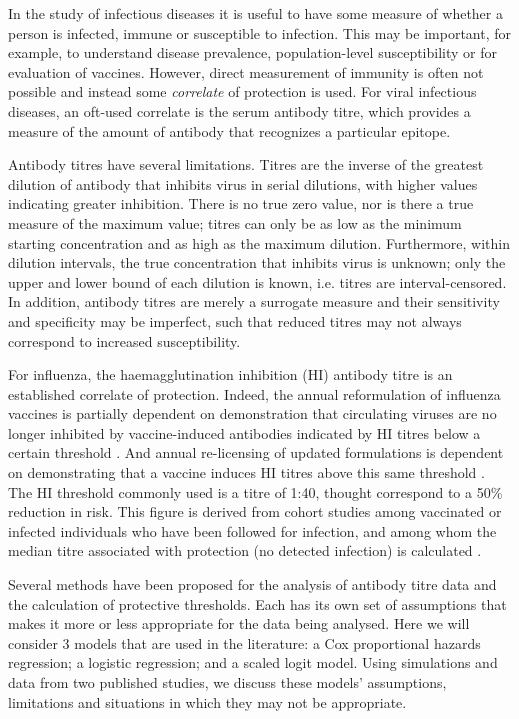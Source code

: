 In the study of infectious diseases it is useful to have some measure of whether a person is infected, immune or susceptible to infection. This may be important, for example, to understand disease prevalence, population-level susceptibility or for evaluation of vaccines.  However, direct measurement of immunity is often not possible and instead some \textit{correlate} of protection is used. For viral infectious diseases, an oft-used correlate is the serum antibody titre, which provides a measure of the amount of antibody that recognizes a particular epitope. 

Antibody titres have several limitations. Titres are the inverse of the greatest dilution of antibody that inhibits virus in serial dilutions, with higher values indicating greater inhibition. There is no true zero value, nor is there a true measure of the maximum value; titres can only be as low as the minimum starting concentration and as high as the maximum dilution.  Furthermore, within dilution intervals, the true concentration that inhibits virus is unknown; only the upper and lower bound of each dilution is known, i.e. titres are interval-censored. In addition, antibody titres are merely a surrogate measure and their sensitivity and specificity may be imperfect, such that reduced titres may not always correspond to increased susceptibility. 

For influenza, the haemagglutination inhibition (HI) antibody titre is an established correlate of protection. Indeed, the annual reformulation of influenza vaccines is partially dependent on demonstration that circulating viruses are no longer inhibited by vaccine-induced antibodies indicated by HI titres below a certain threshold \citep{Barr;2014}. And annual re-licensing of updated formulations is dependent on demonstrating that a vaccine induces HI titres above this same threshold \citep{Wood;2003}.  The HI threshold commonly used is a titre of 1:40, thought correspond to a 50\% reduction in risk. This figure is derived from cohort studies among vaccinated or infected individuals who have been followed for infection, and among whom the median titre associated with protection (no detected infection) is calculated \citep{Hobson;1972, Ng;2013}. 


Several methods have been proposed for the analysis of antibody titre data and the calculation of protective thresholds. Each has its own set of assumptions that makes it more or less appropriate for the data being analysed. Here we will consider 3 models that are used in the literature: a Cox proportional hazards regression; a logistic regression; and a scaled logit model. Using simulations and data from two published studies, we discuss these models' assumptions, limitations and situations in which they may not be appropriate.
